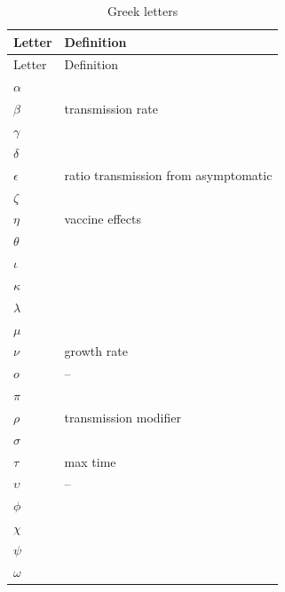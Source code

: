 \documentclass[
]{article}
\begin{document}
\begin{longtable}[]{@{}
  >{\centering\arraybackslash}p{}
  >{\centering\arraybackslash}p{}@{}}
\caption{Greek letters}\tabularnewline
\toprule
Letter & Definition \\
\midrule
\endfirsthead
\toprule
Letter & Definition \\
\midrule
\endhead
\(\alpha\) & \\
\(\beta\) & transmission rate \\
\(\gamma\) & \\
\(\delta\) & \\
\(\epsilon\) & ratio transmission from
asymptomatic \\
\(\zeta\) & \\
\(\eta\) & vaccine effects \\
\(\theta\) & \\
\(\iota\) & \\
\(\kappa\) & \\
\(\lambda\) & \\
\(\mu\) & \\
\(\nu\) & growth rate \\
\(o\) & -- \\
\(\pi\) & \\
\(\rho\) & transmission modifier \\
\(\sigma\) & \\
\(\tau\) & max time \\
\(\upsilon\) & -- \\
\(\phi\) & \\
\(\chi\) & \\
\(\psi\) & \\
\(\omega\) & \\
\bottomrule
\end{longtable}
\end{document}
